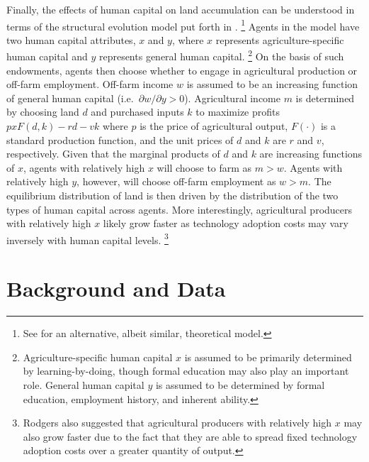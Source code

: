 \documentclass[english]{article}
\begin{document}
Finally, the effects of human capital on land accumulation can be understood
in terms of the structural evolution model put forth in \citet{rodgers1994}.%
\footnote{See \citet{sumner1987} for an alternative, albeit similar, theoretical
model.}
Agents in the model have two human capital attributes, $x$ and $y$, where
$x$ represents agriculture-specific human capital and $y$ represents general 
human capital.%
\footnote{Agriculture-specific human capital $x$ is assumed to be primarily 
determined by learning-by-doing, though formal education may also play an 
important role. 
General human capital $y$ is assumed to be determined by formal education, 
employment history, and inherent ability.}
On the basis of such endowments, agents then choose whether to engage in 
agricultural production or off-farm employment.
Off-farm income $w$ is assumed to be an increasing function of general
human capital (i.e.\ $\partial w/ \partial y > 0$). 
Agricultural income $m$ is determined by choosing land $d$ and purchased 
inputs $k$ to maximize profits $p x F(d,k) - rd - vk$ where $p$ is the price 
of agricultural output, $F(\cdot)$ is a standard production function, 
and the unit prices of $d$ and $k$ are $r$ and $v$, respectively.
Given that the marginal products of $d$ and $k$ are increasing functions of 
$x$, agents with relatively high $x$ will choose to farm as $m > w$.
Agents with relatively high $y$, however, will choose off-farm employment
 as $w > m$.
The equilibrium distribution of land is then driven by the distribution of the 
two types of human capital across agents.
More interestingly, agricultural producers with relatively high $x$ likely 
grow faster as technology adoption costs may vary inversely with human 
capital levels.%
\footnote{Rodgers also suggested that agricultural producers with relatively 
high $x$ may also grow faster due to the fact that they are able to spread fixed 
technology adoption costs over a greater quantity of output.}



\section{Background and Data}
\label{sec: data}
\end{document}
